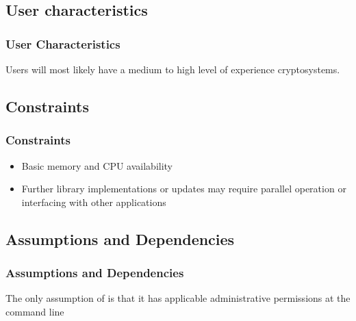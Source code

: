 
\subsection{User characteristics}
\begin{frame}
\frametitle{User Characteristics}
Users will most likely have a medium  to high level of experience cryptosystems.
\end{frame}


\subsection{Constraints}

\begin{frame}
\frametitle{Constraints}
\begin{itemize}
  \item Basic memory and CPU availability
  \item Further library implementations or updates may require parallel operation or interfacing with other applications
\end{itemize}
\end{frame}


\subsection{Assumptions and Dependencies}

\begin{frame}
\frametitle{Assumptions and Dependencies}
The only assumption of \cry{} is that it has applicable administrative permissions at the command line
\end{frame}

